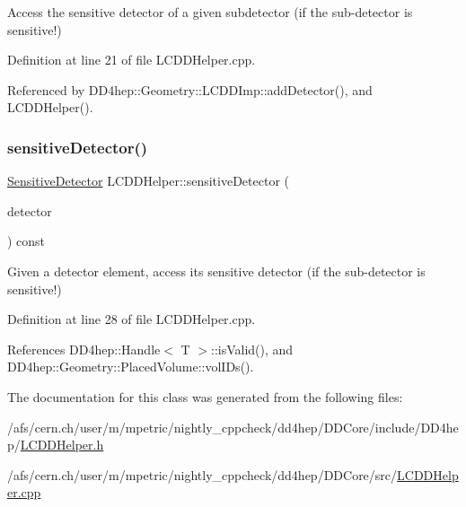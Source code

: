 Access the sensitive detector of a given subdetector (if the sub-\/detector is sensitive!) 



Definition at line 21 of file L\+C\+D\+D\+Helper.\+cpp.



Referenced by D\+D4hep\+::\+Geometry\+::\+L\+C\+D\+D\+Imp\+::add\+Detector(), and L\+C\+D\+D\+Helper().

\hypertarget{class_d_d4hep_1_1_geometry_1_1_l_c_d_d_helper_a84699961a1e06474706df5bdbd7c9335}{}\label{class_d_d4hep_1_1_geometry_1_1_l_c_d_d_helper_a84699961a1e06474706df5bdbd7c9335} 
\subsubsection{\texorpdfstring{sensitive\+Detector()}{sensitiveDetector()}\hspace{0.1cm}{\footnotesize\ttfamily [2/2]}}
{\footnotesize\ttfamily \hyperlink{class_d_d4hep_1_1_geometry_1_1_sensitive_detector}{Sensitive\+Detector} L\+C\+D\+D\+Helper\+::sensitive\+Detector (\begin{DoxyParamCaption}\item[{\hyperlink{class_d_d4hep_1_1_geometry_1_1_det_element}{Det\+Element}}]{detector }\end{DoxyParamCaption}) const}



Given a detector element, access it\textquotesingle{}s sensitive detector (if the sub-\/detector is sensitive!) 



Definition at line 28 of file L\+C\+D\+D\+Helper.\+cpp.



References D\+D4hep\+::\+Handle$<$ T $>$\+::is\+Valid(), and D\+D4hep\+::\+Geometry\+::\+Placed\+Volume\+::vol\+I\+Ds().



The documentation for this class was generated from the following files\+:\begin{DoxyCompactItemize}
\item 
/afs/cern.\+ch/user/m/mpetric/nightly\+\_\+cppcheck/dd4hep/\+D\+D\+Core/include/\+D\+D4hep/\hyperlink{_l_c_d_d_helper_8h}{L\+C\+D\+D\+Helper.\+h}\item 
/afs/cern.\+ch/user/m/mpetric/nightly\+\_\+cppcheck/dd4hep/\+D\+D\+Core/src/\hyperlink{_l_c_d_d_helper_8cpp}{L\+C\+D\+D\+Helper.\+cpp}\end{DoxyCompactItemize}
